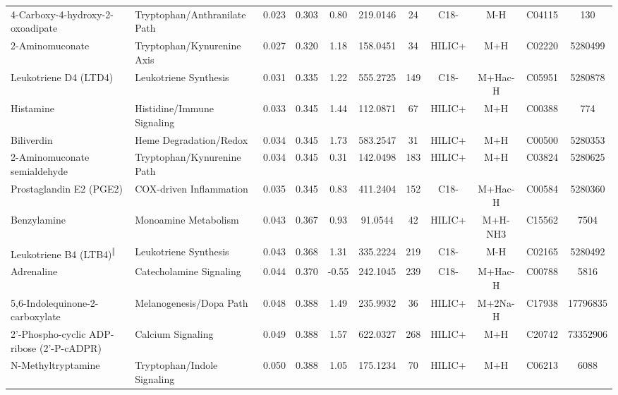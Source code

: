 \begin{longtable}[t]{llccccccccc}
\hspace*{0.3cm}4-Carboxy-4-hydroxy-2-oxoadipate & Tryptophan/Anthranilate Path & 0.023 & 0.303 & 0.80 & 219.0146 & 24 & C18- & M-H & C04115 & 130\\
\hspace*{0.3cm}2-Aminomuconate & Tryptophan/Kynurenine Axis & 0.027 & 0.320 & 1.18 & 158.0451 & 34 & HILIC+ & M+H & C02220 & 5280499\\
\hspace*{0.3cm}Leukotriene D4 (LTD4) & Leukotriene Synthesis & 0.031 & 0.335 & 1.22 & 555.2725 & 149 & C18- & M+Hac-H & C05951 & 5280878\\
\hspace*{0.3cm}Histamine & Histidine/Immune Signaling & 0.033 & 0.345 & 1.44 & 112.0871 & 67 & HILIC+ & M+H & C00388 & 774\\
\hspace*{0.3cm}Biliverdin & Heme Degradation/Redox & 0.034 & 0.345 & 1.73 & 583.2547 & 31 & HILIC+ & M+H & C00500 & 5280353\\

\hspace*{0.3cm}2-Aminomuconate semialdehyde & Tryptophan/Kynurenine Path & 0.034 & 0.345 & 0.31 & 142.0498 & 183 & HILIC+ & M+H & C03824 & 5280625\\
\hspace*{0.3cm}Prostaglandin E2 (PGE2) & COX-driven Inflammation & 0.035 & 0.345 & 0.83 & 411.2404 & 152 & C18- & M+Hac-H & C00584 & 5280360\\
\hspace*{0.3cm}Benzylamine & Monoamine Metabolism & 0.043 & 0.367 & 0.93 & 91.0544 & 42 & HILIC+ & M+H-NH3 & C15562 & 7504\\
\hspace*{0.3cm}Leukotriene B4 (LTB4)\textsuperscript{‖} & Leukotriene Synthesis & 0.043 & 0.368 & 1.31 & 335.2224 & 219 & C18- & M-H & C02165 & 5280492\\
\hspace*{0.3cm}Adrenaline & Catecholamine Signaling & 0.044 & 0.370 & -0.55 & 242.1045 & 239 & C18- & M+Hac-H & C00788 & 5816\\

\hspace*{0.3cm}5,6-Indolequinone-2-carboxylate & Melanogenesis/Dopa Path & 0.048 & 0.388 & 1.49 & 235.9932 & 36 & HILIC+ & M+2Na-H & C17938 & 17796835\\
\hspace*{0.3cm}2'-Phospho-cyclic ADP-ribose (2'-P-cADPR) & Calcium Signaling & 0.049 & 0.388 & 1.57 & 622.0327 & 268 & HILIC+ & M+H & C20742 & 73352906\\
\hspace*{0.3cm}N-Methyltryptamine & Tryptophan/Indole Signaling & 0.050 & 0.388 & 1.05 & 175.1234 & 70 & HILIC+ & M+H & C06213 & 6088\\*
\end{longtable}
\endgroup{}
